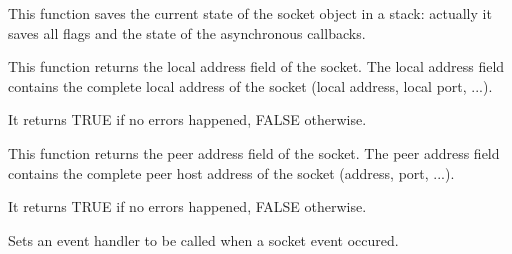%
%
\label{wxsocketbasesavestate}


This function saves the current state of the socket object in a stack:
actually it saves all flags and the state of the asynchronous callbacks. 



%
%


This function returns the local address field of the socket. The local
address field contains the complete local address of the socket (local
address, local port, ...).


It returns TRUE if no errors happened, FALSE otherwise.

%
%


This function returns the peer address field of the socket. The peer 
address field contains the complete peer host address of the socket
(address, port, ...).


It returns TRUE if no errors happened, FALSE otherwise.

\label{wxsocketbaseseteventhandler}


Sets an event handler to be called when a socket event occured.




